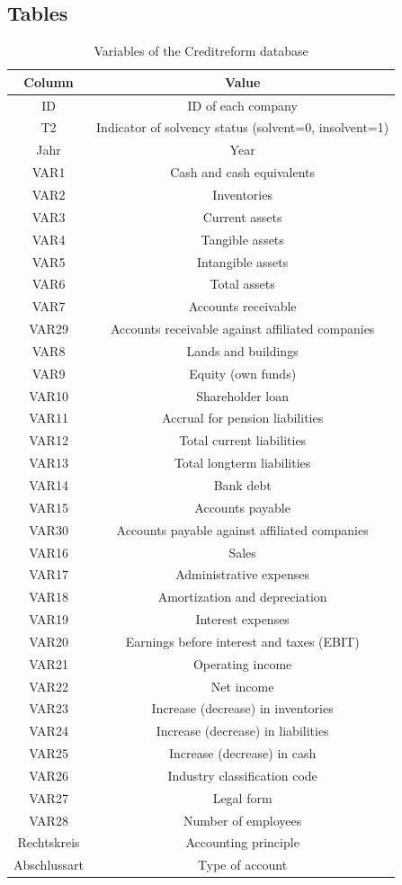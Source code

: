 \documentclass{article}
\begin{document}
\newpage

\subsection{Tables}
\begin{center}
\begin{table}[h]
\caption{Variables of the Creditreform database}
\label{creditVars}
\begin{tabular}{cc} 
\hline\hline
Column & Value\\
\hline
ID & ID of each company\\
T2 & Indicator of solvency status (solvent=0, insolvent=1)\\
Jahr & Year\\
VAR1 & Cash and cash equivalents\\
VAR2 & Inventories\\
VAR3 & Current assets\\
VAR4 & Tangible assets\\
VAR5 & Intangible assets\\
VAR6 & Total assets\\
VAR7 & Accounts receivable\\
VAR29 & Accounts receivable against affiliated companies\\
VAR8 & Lands and buildings\\
VAR9 & Equity (own funds)\\
VAR10 & Shareholder loan\\
VAR11 & Accrual for pension liabilities\\
VAR12 & Total current liabilities\\
VAR13 & Total longterm liabilities\\
VAR14 & Bank debt\\
VAR15 & Accounts payable\\
VAR30 & Accounts payable against affiliated companies\\
VAR16 & Sales\\
VAR17 & Administrative expenses\\
VAR18 & Amortization and depreciation\\
VAR19 & Interest expenses\\
VAR20 & Earnings before interest and taxes (EBIT)\\
VAR21 & Operating income\\
VAR22 & Net income\\
VAR23 & Increase (decrease) in inventories\\
VAR24 & Increase (decrease) in liabilities\\
VAR25 & Increase (decrease) in cash\\
VAR26 & Industry classification code\\
VAR27 & Legal form\\
VAR28 & Number of employees\\
Rechtskreis & Accounting principle\\
Abschlussart & Type of account\\
\hline\hline
\end{tabular}
\end{table}
\end{center}
\end{document}
